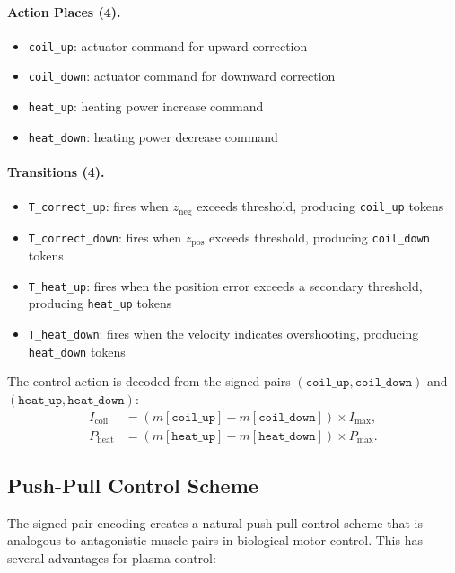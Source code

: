 \documentclass[12pt]{article}
\newcommand{\code}[1]{\texttt{#1}}
\begin{document}
\paragraph{Action Places (4).}
\begin{itemize}
  \item \code{coil\_up}: actuator command for upward correction
  \item \code{coil\_down}: actuator command for downward correction
  \item \code{heat\_up}: heating power increase command
  \item \code{heat\_down}: heating power decrease command
\end{itemize}

\paragraph{Transitions (4).}
\begin{itemize}
  \item \code{T\_correct\_up}: fires when $z_{\text{neg}}$ exceeds
    threshold, producing \code{coil\_up} tokens
  \item \code{T\_correct\_down}: fires when $z_{\text{pos}}$ exceeds
    threshold, producing \code{coil\_down} tokens
  \item \code{T\_heat\_up}: fires when the position error exceeds a
    secondary threshold, producing \code{heat\_up} tokens
  \item \code{T\_heat\_down}: fires when the velocity indicates
    overshooting, producing \code{heat\_down} tokens
\end{itemize}

The control action is decoded from the signed pairs
$(\code{coil\_up}, \code{coil\_down})$ and
$(\code{heat\_up}, \code{heat\_down})$:
\begin{align}
  I_{\mathrm{coil}} &= (m[\code{coil\_up}] - m[\code{coil\_down}])
    \times I_{\mathrm{max}}, \\
  P_{\mathrm{heat}} &= (m[\code{heat\_up}] - m[\code{heat\_down}])
    \times P_{\mathrm{max}}.
\end{align}

\subsection{Push-Pull Control Scheme}

The signed-pair encoding creates a natural push-pull control scheme that
is analogous to antagonistic muscle pairs in biological motor control.
This has several advantages for plasma control:
\end{document}
